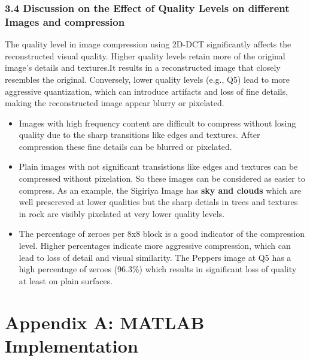 \documentclass[12pt]{article}
\begin{document}
\subsubsection*{3.4 Discussion on the Effect of Quality Levels on different Images and compression}
The quality level in image compression using 2D-DCT significantly affects the reconstructed visual quality. Higher quality levels retain more of the original image's details and textures.It results in a reconstructed image that closely resembles the original. Conversely, lower quality levels (e.g., Q5) lead to more aggressive quantization, which can introduce artifacts and loss of fine details, making the reconstructed image appear blurry or pixelated.    

\begin{itemize}
    \item Images with high frequency content are difficult to compress without losing quality due to the sharp transitions like edges and textures. After compression these fine details can be blurred or pixelated.
    \item Plain images with not significant transistions like edges and textures can be compressed without pixelation. So these images can be considered as easier to compress. As an example, the Sigiriya Image has \textbf{sky and clouds} which are well presereved at lower qualities but the sharp detials in {trees and textures in rock} are visibly pixelated at very lower quality levels.
    \item The percentage of zeroes per 8x8 block is a good indicator of the compression level. Higher percentages indicate more aggressive compression, which can lead to loss of detail and visual similarity. The Peppers image at Q5 has a high percentage of zeroes (96.3\%) which results in significant loss of quality at least on plain surfaces.
\end{itemize}
\clearpage
\appendix
\section*{Appendix A: MATLAB Implementation}
\end{document}
